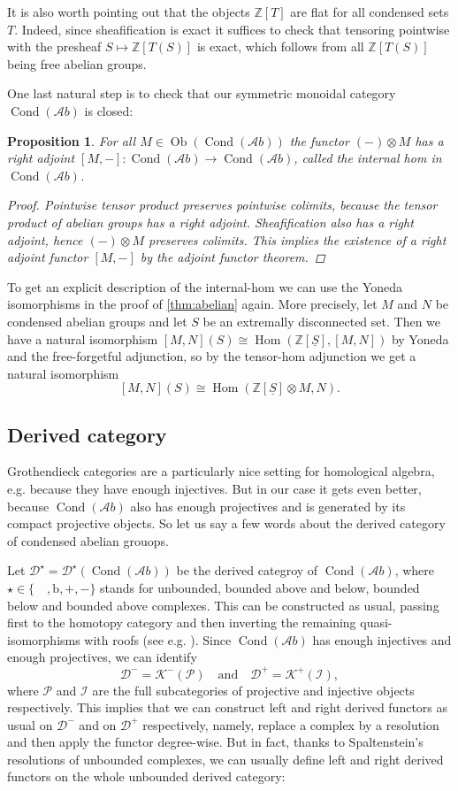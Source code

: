 \documentclass[11pt,A4]{article}
\theoremstyle{plain}
\newtheorem{prop}[thm]{Proposition}
\theoremstyle{definition}
\theoremstyle{remark}
\newcommand{\Z}{\mathbb{Z}}
\newcommand{\1}{\mathbbm{1}}
\newcommand{\Ab}{\mathscr{A}b}
\newcommand{\D}{\mathscr{D}}
\newcommand{\K}{\mathscr{K}}
\DeclareMathOperator{\Hom}{Hom}
\DeclareMathOperator{\Cond}{Cond}
\DeclareMathOperator{\Ob}{Ob}
\renewcommand{\u}[1]{\underline{#1}}
\newcommand{\ot}{\otimes}
\begin{document}
It is also worth pointing out that the objects $\Z[T]$ are flat for all condensed sets $T$.
Indeed, since sheafification is exact it suffices to check that tensoring pointwise with the presheaf $S\mapsto \Z[T(S)]$ is exact, which follows from all $\Z[T(S)]$ being free abelian groups.

One last natural step is to check that our symmetric monoidal category $\Cond(\Ab)$ is closed:

\begin{prop}
    For all $M\in \Ob(\Cond(\Ab))$ the functor $(-)\ot M$ has a right adjoint $[M,-]\colon \Cond(\Ab)\to \Cond(\Ab)$, called the \textit{internal hom} in $\Cond(\Ab)$.
    \begin{proof}
	Pointwise tensor product preserves pointwise colimits, because the tensor product of abelian groups has a right adjoint.
	Sheafification also has a right adjoint, hence $(-)\ot M$ preserves colimits.
	This implies the existence of a right adjoint functor $[M,-]$ by the adjoint functor theorem.
    \end{proof}
\end{prop}

To get an explicit description of the internal-hom we can use the Yoneda isomorphisms in the proof of \cref{thm:abelian} again.
More precisely, let $M$ and $N$ be condensed abelian groups and let $S$ be an extremally disconnected set.
Then we have a natural isomorphism $[M,N](S)\cong \Hom(\Z[\u{S}],[M,N])$ by Yoneda and the free-forgetful adjunction, so by the tensor-hom adjunction we get a natural isomorphism
\[ [M,N](S)\cong \Hom(\Z[\u{S}]\ot M,N).\]

\subsection{Derived category}

Grothendieck categories are a particularly nice setting for homological algebra, e.g. because they have enough injectives.
But in our case it gets even better, because $\Cond(\Ab)$ also has enough projectives and is generated by its compact projective objects.
So let us say a few words about the derived category of condensed abelian grouops.

Let $\D^{\star}=\D^{\star}(\Cond(\Ab))$ be the derived categroy of $\Cond(\Ab)$, where $\star\in \{\quad,\mathrm{b},+,-\}$ stands for unbounded, bounded above and below, bounded below and bounded above complexes.
This can be constructed as usual, passing first to the homotopy category and then inverting the remaining quasi-isomorphisms with roofs (see e.g. \cite{gm03}).
Since $\Cond(\Ab)$ has enough injectives and enough projectives, we can identify
\[ \D^{-}=\K^{-}(\mathscr{P}) \quad \text{and} \quad \D^{+}=\K^{+}(\mathscr{I}),\]
where $\mathscr{P}$ and $\mathscr{I}$ are the full subcategories of projective and injective objects respectively.
This implies that we can construct left and right derived functors as usual on $\D^{-}$ and on $\D^{+}$ respectively, namely, replace a complex by a resolution and then apply the functor degree-wise.
But in fact, thanks to Spaltenstein's resolutions of unbounded complexes, we can usually define left and right derived functors on the whole unbounded derived category:
\end{document}
